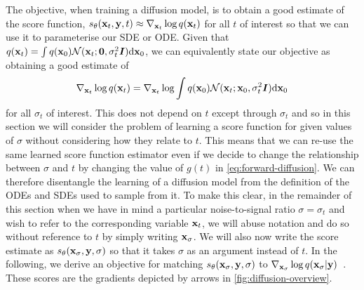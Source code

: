 The objective, when training a diffusion model, is to obtain a good estimate of the score function, $s_\theta({\mathbf{x}}_t, {\mathbf{y}}, t) \approx \nabla_{{\mathbf{x}}_t} \log q({\mathbf{x}}_t)$ for all $t$ of interest so that we can use it to parameterise our SDE or ODE. Given that $q({\mathbf{x}}_t) = \int q({\mathbf{x}}_0) {\mathcal{N}}({\mathbf{x}}_t; {\bm{0}}, \sigma_t^2{\bm{I}}) \mathrm{d}{\mathbf{x}}_0$, we can equivalently state our objective as obtaining a good estimate of 
$$
\nabla_{{\mathbf{x}}_t} \log q({\mathbf{x}}_t) = \nabla_{{\mathbf{x}}_t} \log \int q({\mathbf{x}}_0) {\mathcal{N}}({\mathbf{x}}_t; {\mathbf{x}}_0, \sigma_t^2{\bm{I}}) \mathrm{d}{\mathbf{x}}_0
$$
for all $\sigma_t$ of interest. This does not depend on $t$ except through $\sigma_t$ and so in this section we will consider the problem of learning a score function for given values of $\sigma$ without considering how they relate to $t$. This means that we can re-use the same learned score function estimator even if we decide to change the relationship between $\sigma$ and $t$ by changing the value of $g(t)$ in \cref{eq:forward-diffusion}. We can therefore disentangle the learning of a diffusion model from the definition of the ODEs and SDEs used to sample from it. To make this clear, in the remainder of this section when we have in mind a particular noise-to-signal ratio $\sigma=\sigma_t$ and wish to refer to the corresponding variable ${\mathbf{x}}_t$, we will abuse notation and do so without reference to $t$ by simply writing ${\mathbf{x}}_\sigma$. We will also now write the score estimate as $s_\theta({\mathbf{x}}_\sigma, {\mathbf{y}}, \sigma)$ so that it takes $\sigma$ as an argument instead of $t$. In the following, we derive an objective for matching $s_\theta({\mathbf{x}}_\sigma, {\mathbf{y}}, \sigma)$ to $\nabla_{{\mathbf{x}}_\sigma} \log q({\mathbf{x}}_\sigma |{\mathbf{y}})$~\citep{vincent2011connection,song2019generative}. These scores are the gradients depicted by arrows in \cref{fig:diffusion-overview}.


